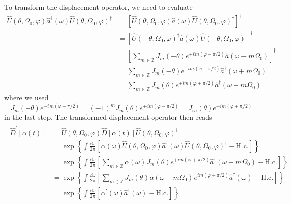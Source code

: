 To transform the displacement operator, we need to evaluate
\begin{equation}
	\begin{split}
		\hat{U}(\theta,\Omega_0,\varphi)
		\hat{a}^\dagger(\omega)
		\hat{U}(\theta,\Omega_0,\varphi)^\dagger
		&=
		\left[
			\hat{U}(\theta,\Omega_0,\varphi)
			\hat{a}(\omega)
			\hat{U}(\theta,\Omega_0,\varphi)^\dagger	
		\right]^\dagger
		\\
		&=
		\left[
			\hat{U}(-\theta,\Omega_0,\varphi)^\dagger
			\hat{a}(\omega)
			\hat{U}(-\theta,\Omega_0,\varphi)
		\right]^\dagger
		\\
		&=
		\left[
			\sum_{m\in\mathbb{Z}}
			J_m(-\theta)
			e^{+im(\varphi-\pi/2)}
			\hat{a}(\omega+m\Omega_0)
		\right]^\dagger
		\\
		&=
		\sum_{m\in\mathbb{Z}}
		J_m(-\theta)
		e^{-im(\varphi-\pi/2)}
		\hat{a}^\dagger(\omega+m\Omega_0)
		\\
		&=
		\sum_{m\in\mathbb{Z}}
		J_m(\theta)
		e^{+im(\varphi+\pi/2)}
		\hat{a}^\dagger(\omega+m\Omega_0)
	\end{split}
\end{equation}
where we used
\begin{equation}
	J_m(-\theta)
	e^{-im(\varphi-\pi/2)}
	=
	(-1)^m
	J_m(\theta)
	e^{+im(\varphi-\pi/2)}
	=
	J_m(\theta)
	e^{+im(\varphi+\pi/2)}
\end{equation}
in the last step.
The transformed displacement operator then reads
\begin{align}
	\begin{split}
		\hat{D}^\prime\left[\alpha(t)\right]
		&=
		\hat{U}(\theta,\Omega_0,\varphi)
		\hat{D}\left[\alpha(t)\right]
		\hat{U}(\theta,\Omega_0,\varphi)^\dagger
		\\
		&=
		\exp\left\{
			\int\frac{\dd{\omega}}{2\pi}
			\left[
				\alpha(\omega)
				\hat{U}(\theta,\Omega_0,\varphi)
				\hat{a}^\dagger(\omega)
				\hat{U}(\theta,\Omega_0,\varphi)^\dagger
				-
				\text{H.c.}
			\right]
		\right\}
		\\
		&=
		\exp\left\{
			\int\frac{\dd{\omega}}{2\pi}
			\left[
				\sum_{m\in\mathbb{Z}}
				\alpha(\omega)
				J_m(\theta)
				e^{+im(\varphi+\pi/2)}
				\hat{a}^\dagger(\omega+m\Omega_0)
				-
				\text{H.c.}
			\right]
		\right\}
		\\
		&=
		\exp\left\{
			\int\frac{\dd{\omega}}{2\pi}
			\left[
				\sum_{m\in\mathbb{Z}}
				J_m(\theta)
				\alpha(\omega-m\Omega_0)
				e^{im(\varphi+\pi/2)}
				\hat{a}^\dagger(\omega)
				-
				\text{H.c.}
			\right]
		\right\}
		\\
		&=
		\exp\left\{
			\int\frac{\dd{\omega}}{2\pi}
			\left[
				\alpha^\prime(\omega)
				\hat{a}^\dagger(\omega)
				-
				\text{H.c.}
			\right]
		\right\}
	\end{split}	
\end{align}
